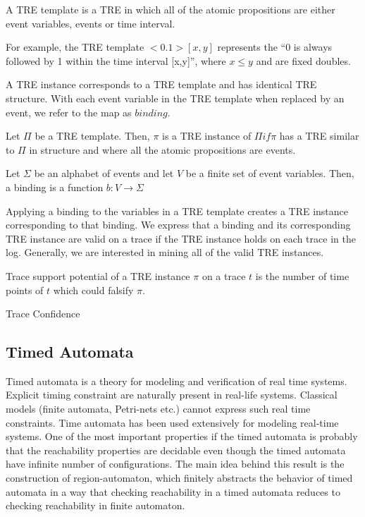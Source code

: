 \documentclass[]{sigplanconf}
\begin{document}
\begin{defns} A TRE template is a TRE in which all of the atomic propositions are either event variables, events or time interval.
\end{defns}
For example, the TRE template $<0.1>[x,y]$ represents the ``0 is always followed by 1 within the time interval [x,y]'', where $x \le y$ and are fixed doubles.

A TRE instance corresponds to a TRE template and has identical TRE structure. With each event variable in the TRE template when replaced by an event, we refer to the map as $binding$.

\begin{defns}
Let $\Pi$ be a TRE template. Then, $\pi$ is a TRE instance of $\Pi if \pi$ has a TRE similar to $\Pi$ in structure and where all the atomic propositions are events.
\end{defns}

\begin{defns}[Binding]
Let $\Sigma$ be an alphabet of events and let $V$ be a finite set of event variables. Then, a binding is a function $b \colon V \rightarrow \Sigma$
\end{defns}

Applying a binding to the variables in a TRE template creates a TRE instance corresponding to that binding. We express that a binding and its corresponding TRE instance are valid on a trace if the TRE instance holds on each trace in the log. Generally, we are interested in mining all of the valid TRE instances.

\begin{defns}
Trace support potential of a TRE instance $\pi$ on a trace $t$ is the number of time points of $t$ which could falsify $\pi$.
\end{defns}

\begin{defns}{Trace Confidence}

\end{defns}

\subsection{Timed Automata}

Timed automata is a theory for modeling and verification of real time systems.  Explicit timing constraint are naturally present in real-life systems. Classical models (finite automata, Petri-nets etc.) cannot express such real time constraints. Time automata \cite{Alur1990, Alur1994183} has been used extensively for modeling real-time systems. One of the most important properties if the timed automata is probably that the reachability properties are decidable \cite{Alur1994183} even though the timed automata have infinite number of configurations. The main idea behind this result is the construction of region-automaton, which finitely abstracts the behavior of timed automata in a way that checking reachability in a timed automata reduces to checking reachability in finite automaton.
\end{document}

